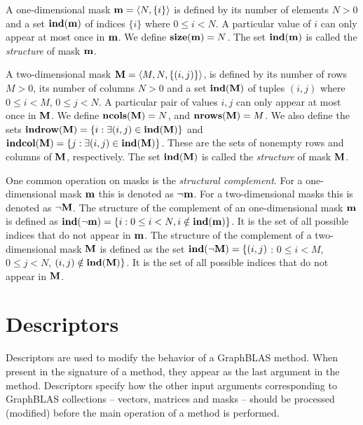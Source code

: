 A one-dimensional mask ${\bf m} = \langle N, \{ i \} \rangle$ is
defined by its number of elements $N>0$ and a set $\bold{ind}({\bf m})$
of indices $\{ i \}$ where $0 \leq i < N$.  A particular value of $i$ can
only appear at most once in ${\bf m}$. We define $\bold{size}({\bf m})
= N$. The set $\bold{ind}({\bf m})$ is called the \emph{structure} of mask ${\bf m}$.

A two-dimensional mask ${\bf M} = \langle M, N, \{ (i,j) \}
\rangle$, is defined by its number of rows $M>0$, its number of
columns $N>0$ and a set $\bold{ind}({\bf M})$ of tuples $(i,j)$
where $0 \leq i < M$, $0 \leq j < N$.   A particular pair of values
$i,j$ can only appear at most once in ${\bf M}$.  We define
$\bold{ncols}({\bf M}) = N$, and $\bold{nrows}({\bf M}) = M$.
We also define the sets ${\bf indrow({\bf M})} = \{ i : \exists
(i,j) \in \bold{ind}({\bf M}) \}$ and ${\bf indcol({\bf M})}
= \{ j : \exists (i,j) \in \bold{ind}({\bf M}) \}$.  These are
the sets of nonempty rows and columns of ${\bf M}$, respectively.
The set $\bold{ind}({\bf M})$ is called the \emph{structure} of mask ${\bf M}$.

One common operation on masks is the \emph{structural complement}.
For a one-dimensional mask ${\bf m}$ this is denoted as
$\neg{\bf m}$. For a two-dimensional masks this is denoted as
$\neg{\bf M}$.  The structure of the complement of an one-dimensional
mask ${\bf m}$ is defined as $\bold{ind}(\neg{\bf m}) = \{i : 0
\leq i < N, i \notin \bold{ind}({\bf m}) \}$.  It is the set of all
possible indices that do not appear in ${\bf m}$.  The structure
of the complement of a two-dimensional mask ${\bf M}$ is defined as the set
$\bold{ind}(\neg{\bf M}) = \{(i,j)$ : $0 \leq i < M$, $0 \leq j < N$,
$(i,j) \notin \bold{ind}({\bf M}) \}$.  It is the set of all possible
indices that do not appear in ${\bf M}$.

\section{Descriptors}

Descriptors are used to modify the behavior of a GraphBLAS method.
When present in the signature of a method, they appear as the last argument in the method.
Descriptors specify how the other input arguments
corresponding to GraphBLAS collections -- vectors, matrices and masks -- should
be processed (modified) before the main operation of a method is performed.

